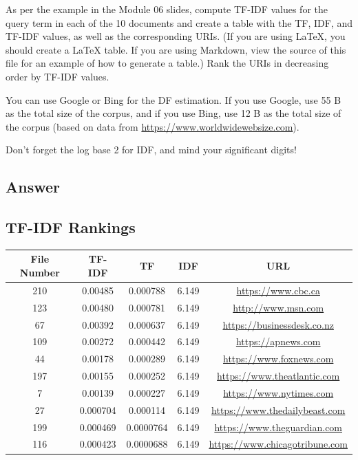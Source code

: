 \documentclass[12pt]{article}
\begin{document}
As per the example in the Module 06 slides, compute TF-IDF values for the query term in each of the 10 documents and create a table with the TF, IDF, and TF-IDF values, as well as the corresponding URIs. (If you are using LaTeX, you should create a LaTeX table. If you are using Markdown, view the source of this file for an example of how to generate a table.) Rank the URIs in decreasing order by TF-IDF values.

You can use Google or Bing for the DF estimation. If you use Google, use 55 B as the total size of the corpus, and if you use Bing, use 12 B as the total size of the corpus (based on data from \url{https://www.worldwidewebsize.com}).

Don't forget the log base 2 for IDF, and mind your significant digits!

\subsection*{Answer}
\subsection*{TF-IDF Rankings}
\begin{center}
\begin{tabular}{ |c|c|c|c|c| } 
 \hline
 \textbf{File Number} & \textbf{TF-IDF} & \textbf{TF} & \textbf{IDF} & \textbf{URL}\\
 \hline
 210 & 0.00485 & 0.000788 & 6.149 & \url{https://www.cbc.ca}\\
 123 & 0.00480 & 0.000781 & 6.149 & \url{http://www.msn.com}\\
 67 & 0.00392 & 0.000637 & 6.149 & \url{https://businessdesk.co.nz}\\
 109 & 0.00272 & 0.000442 & 6.149 & \url{https://apnews.com}\\
 44 & 0.00178 & 0.000289 & 6.149 & \url{https://www.foxnews.com}\\
 197 & 0.00155 & 0.000252 & 6.149 & \url{https://www.theatlantic.com}\\
 7 & 0.00139 & 0.000227 & 6.149 & \url{https://www.nytimes.com}\\
 27 & 0.000704 & 0.000114 & 6.149 & \url{https://www.thedailybeast.com}\\
 199 & 0.000469 & 0.0000764 & 6.149 & \url{https://www.theguardian.com}\\
 116 & 0.000423 & 0.0000688 & 6.149 & \url{https://www.chicagotribune.com}\\
 \hline
\end{tabular}
\end{center}
\end{document}
